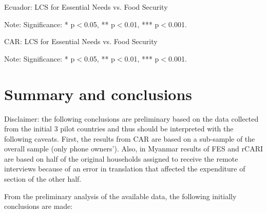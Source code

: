 \documentclass[11pt,harvard]{article}
\begin{document}
\begin{table}[htbp]
	\centering
	\begin{adjustbox}{max width=\textwidth}
		\begin{threeparttable}
			\caption{Ecuador: LCS for Essential Needs vs. Food Security}
			\scriptsize
			 
			\label{tab:LCS_F2F_EN_FS_Ecuador}
			\begin{tablenotes}
				\item Note: Significance: * p$<$0.05, ** p$<$0.01, *** p$<$0.001. 
			\end{tablenotes}
		\end{threeparttable}
	\end{adjustbox}
\end{table}



\begin{table}[htbp]
	\centering
	\begin{adjustbox}{max width=\textwidth}
		\begin{threeparttable}
			\caption{CAR: LCS for Essential Needs vs. Food Security}
			\scriptsize
			 
			\label{tab:LCS_F2F_EN_FS_CAR}
			\begin{tablenotes}
				\item Note: Significance: * p$<$0.05, ** p$<$0.01, *** p$<$0.001. 
			\end{tablenotes}
		\end{threeparttable}
	\end{adjustbox}
\end{table}


\pagebreak


\section{Summary and conclusions}

Disclaimer: the following conclusions are preliminary based on the data collected from the initial 3 pilot countries and thus should be interpreted with the following caveats. First, the results from CAR are based on a sub-sample of the overall sample (only phone owners’). Also, in Myanmar results of FES and rCARI are based on half of the original households assigned to receive the remote interviews because of an error in translation that affected the expenditure of section of the other half. 

From the preliminary analysis of the available data, the following initially conclusions are made: 
\end{document}
